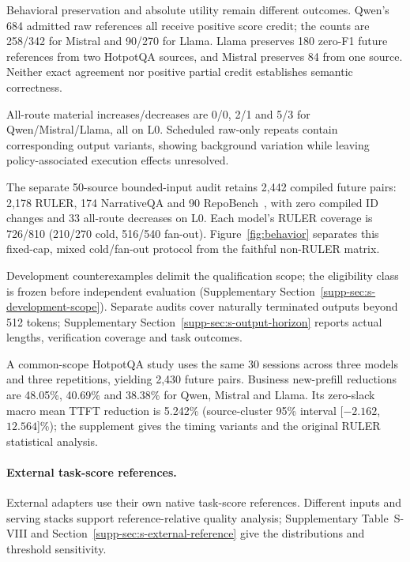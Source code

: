 Behavioral preservation and absolute utility remain different outcomes. Qwen's 684 admitted raw references all receive positive score credit; the counts are 258/342 for Mistral and 90/270 for Llama. Llama preserves 180 zero-F1 future references from two HotpotQA sources, and Mistral preserves 84 from one source. Neither exact agreement nor positive partial credit establishes semantic correctness.

All-route material increases/decreases are 0/0, 2/1 and 5/3 for Qwen/Mistral/Llama, all on L0. Scheduled raw-only repeats contain corresponding output variants, showing background variation while leaving policy-associated execution effects unresolved.

The separate 50-source bounded-input audit retains 2,442 compiled future pairs: 2,178 RULER, 174 NarrativeQA and 90 RepoBench~\cite{ruler2024,narrativeqa2018,qasper2021}, with zero compiled ID changes and 33 all-route decreases on L0. Each model's RULER coverage is 726/810 (210/270 cold, 516/540 fan-out). Figure~\ref{fig:behavior} separates this fixed-cap, mixed cold/fan-out protocol from the faithful non-RULER matrix.

Development counterexamples delimit the qualification scope; the eligibility class is frozen before independent evaluation (Supplementary Section~\ref{supp-sec:s-development-scope}). Separate audits cover naturally terminated outputs beyond 512 tokens; Supplementary Section~\ref{supp-sec:s-output-horizon} reports actual lengths, verification coverage and task outcomes.

A common-scope HotpotQA study uses the same 30 sessions across three models and three repetitions, yielding 2,430 future pairs. Business new-prefill reductions are 48.05\%, 40.69\% and 38.38\% for Qwen, Mistral and Llama. Its zero-slack macro mean TTFT reduction is 5.242\% (source-cluster 95\% interval [$-2.162$, $12.564$]\%); the supplement gives the timing variants and the original RULER statistical analysis.

\paragraph{External task-score references.}\label{sec:baselines}
External adapters use their own native task-score references. Different inputs and serving stacks support reference-relative quality analysis; Supplementary Table~S-VIII and Section~\ref{supp-sec:s-external-reference} give the distributions and threshold sensitivity.

